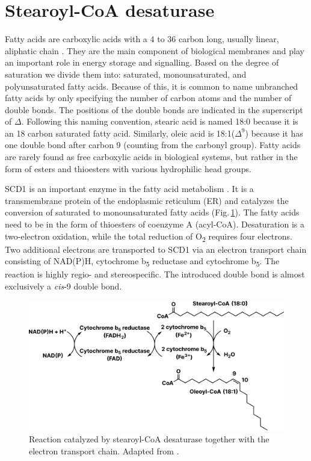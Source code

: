 \section{Stearoyl-CoA desaturase}
Fatty acids are carboxylic acids with a 4 to 36 carbon long, usually linear, aliphatic chain \cite{Lehninger}. They are the main component of biological membranes and play an important role in energy storage and signalling. Based on the degree of saturation we divide them into: saturated, monounsaturated, and polyunsaturated fatty acids. Because of this, it is common to name unbranched fatty acids by only specifying the number of carbon atoms and the number of double bonds. The positions of the double bonds are indicated in the superscript of $\Delta$. Following this naming convention, stearic acid is named 18:0 because it is an 18 carbon saturated fatty acid. Similarly, oleic acid is 18:1($\Delta^{9}$) because it has one double bond after carbon 9 (counting from the carbonyl group). Fatty acids are rarely found as free carboxylic acids in biological systems, but rather in the form of esters and thioesters with various hydrophilic head groups.

SCD1 is an important enzyme in the fatty acid metabolism \cite{Paton2009}. It is a transmembrane protein of the endoplasmic reticulum (ER) and catalyzes the conversion of saturated to monounsaturated fatty acids (Fig.\,\ref{fig:SCD1_reaction}). The fatty acids need to be in the form of thioesters of coenzyme A (acyl-CoA). Desaturation is a two-electron oxidation, while the total reduction of O\textsubscript{2} requires four electrons. Two additional electrons are transported to SCD1 via an electron transport chain consisting of NAD(P)H, cytochrome b\textsubscript{5} reductase and cytochrome b\textsubscript{5}. The reaction is highly regio- and stereospecific. The introduced double bond is almost exclusively a \textit{cis}-9 double bond.

\begin{figure}[htbp]
    \centering
    \includegraphics[width=\textwidth]{Figures/SCD1_reaction.pdf}
    \caption{Reaction catalyzed by stearoyl-CoA desaturase together with the electron transport chain. Adapted from \cite{Paton2009}.}
    \label{fig:SCD1_reaction}
\end{figure}

